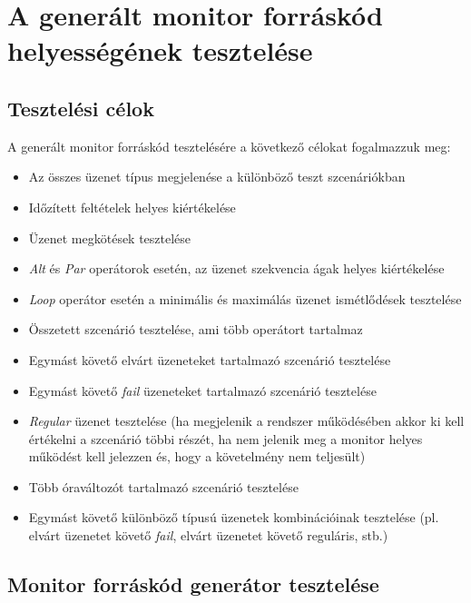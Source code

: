 \chapter{A generált monitor forráskód helyességének tesztelése}

\section{Tesztelési célok}

A generált monitor forráskód tesztelésére a következő célokat fogalmazzuk meg:

\begin{itemize}
    \item Az összes üzenet típus megjelenése a különböző teszt szcenáriókban
    \item Időzített feltételek helyes kiértékelése
    \item Üzenet megkötések tesztelése
    \item \textit{Alt} és \textit{Par} operátorok esetén, az üzenet szekvencia ágak helyes kiértékelése
    \item \textit{Loop} operátor esetén a minimális és maximálás üzenet ismétlődések tesztelése
    \item Összetett szcenárió tesztelése, ami több operátort tartalmaz
    \item Egymást követő elvárt üzeneteket tartalmazó szcenárió tesztelése
    \item Egymást követő \textit{fail} üzeneteket tartalmazó szcenárió tesztelése
    \item \textit{Regular} üzenet tesztelése (ha megjelenik a rendszer működésében akkor ki kell értékelni a szcenárió többi részét, ha nem jelenik meg a monitor helyes működést kell jelezzen és, hogy a követelmény nem teljesült)
    \item Több óraváltozót tartalmazó szcenárió tesztelése
    \item Egymást követő különböző típusú üzenetek kombinációinak tesztelése (pl. elvárt üzenetet követő \textit{fail}, elvárt üzenetet követő reguláris, stb.)
\end{itemize}

\clearpage\section{Monitor forráskód generátor tesztelése}

